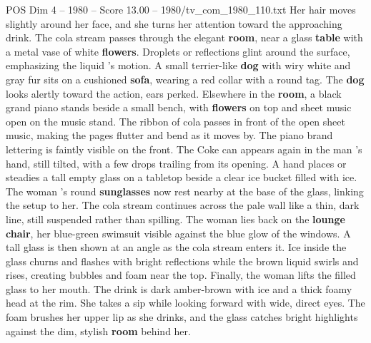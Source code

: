 \begin{textsample}{POS Dim 4 – 1980 – Score 13.00 – 1980/tv\_com\_1980\_110.txt}
Her hair moves slightly around her face, and she turns her attention toward the approaching drink.
The cola stream passes through the elegant \textbf{room}, near a glass \textbf{table} with a metal vase of white \textbf{flowers}.
Droplets or reflections glint around the surface, emphasizing the liquid ’s motion.
A small terrier-like \textbf{dog} with wiry white and gray fur sits on a cushioned \textbf{sofa}, wearing a red collar with a round tag.
The \textbf{dog} looks alertly toward the action, ears perked.
Elsewhere in the \textbf{room}, a black grand piano stands beside a small bench, with \textbf{flowers} on top and sheet music open on the music stand.
The ribbon of cola passes in front of the open sheet music, making the pages flutter and bend as it moves by.
The piano brand lettering is faintly visible on the front.
The Coke can appears again in the man ’s hand, still tilted, with a few drops trailing from its opening.
A hand places or steadies a tall empty glass on a tabletop beside a clear ice bucket filled with ice.
The woman ’s round \textbf{sunglasses} now rest nearby at the base of the glass, linking the setup to her.
The cola stream continues across the pale wall like a thin, dark line, still suspended rather than spilling.
The woman lies back on the \textbf{lounge} \textbf{chair}, her blue-green swimsuit visible against the blue glow of the windows.
A tall glass is then shown at an angle as the cola stream enters it.
Ice inside the glass churns and flashes with bright reflections while the brown liquid swirls and rises, creating bubbles and foam near the top.
Finally, the woman lifts the filled glass to her mouth.
The drink is dark amber-brown with ice and a thick foamy head at the rim.
She takes a sip while looking forward with wide, direct eyes.
The foam brushes her upper lip as she drinks, and the glass catches bright highlights against the dim, stylish \textbf{room} behind her.

\end{textsample}
